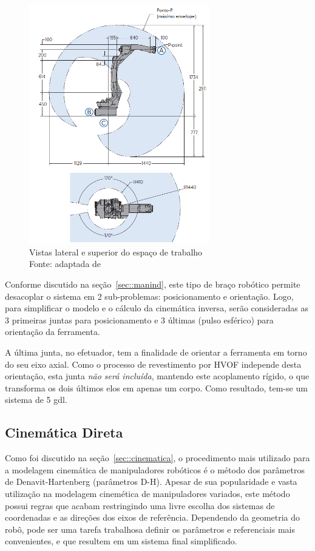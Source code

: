 \begin{figure}[h]
	\centering 
 	\includegraphics[width=0.7\textwidth]{figs/workspace}
 	\caption[Vistas lateral e superior do espaço de trabalho]{Vistas lateral e
 	superior do espaço de trabalho \\Fonte: adaptada de~\cite{manualmh12}}
 	\label{fig::workspace}
\end{figure}

Conforme discutido na seção~\ref{sec::manind}, este tipo de braço robótico
permite desacoplar o sistema em 2 sub-problemas: posicionamento e orientação.
Logo, para simplificar o modelo e o cálculo da cinemática inversa, serão consideradas
as 3 primeiras juntas para posicionamento e 3 últimas (pulso esférico) para
orientação da ferramenta.

A última junta, no efetuador, tem a finalidade de orientar a ferramenta em torno
do seu eixo axial. Como o processo de revestimento por HVOF independe desta
orientação, esta junta \emph{não será incluída}, mantendo este acoplamento
rígido, o que transforma os dois últimos elos em apenas um corpo.
Como resultado, tem-se um sistema de 5 gdl.


\subsection{Cinemática Direta}\label{sec::dkin}

Como foi discutido na seção~\ref{sec::cinematica}, o procedimento mais utilizado
para a modelagem cinemática de manipuladores robóticos é o método dos parâmetros
de Denavit-Hartenberg (parâmetros D-H). Apesar de sua popularidade e vasta
utilização na modelagem cinemética de manipuladores variados, este método possui
regras que acabam restringindo uma livre escolha dos sistemas de coordenadas e
as direções dos eixos de referência. Dependendo da geometria do robô, pode ser
uma tarefa trabalhosa definir os parâmetros e referenciais mais convenientes, e
que resultem em um sistema final simplificado.

